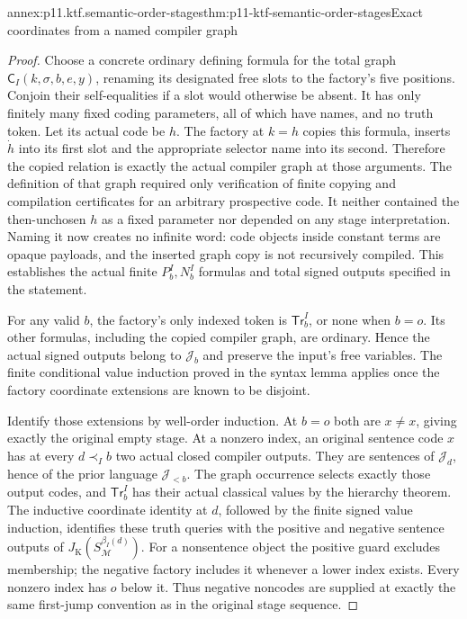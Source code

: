 \begin{annexitem}{annex:p11.ktf.semantic-order-stages}{thm:p11-ktf-semantic-order-stages}{Exact coordinates from a named compiler graph}
\begin{proof}
Choose a concrete ordinary defining formula for the total graph
\(\mathsf C_I(k,\sigma,b,e,y)\), renaming its designated
free slots to the factory's five positions. Conjoin their self-equalities
if a slot would otherwise be absent. It has only finitely many
fixed coding parameters, all of which have names, and no truth token.
Let its actual code be \(h\). The factory at \(k=h\) copies
this formula, inserts \(\dot h\) into its first slot and the
appropriate selector name into its second. Therefore the copied
relation is exactly the actual compiler graph at those arguments.
The definition of that graph required only verification of finite
copying and compilation certificates for an arbitrary prospective
code. It neither contained the then-unchosen \(h\) as a fixed
parameter nor depended on any stage interpretation. Naming it now
creates no infinite word: code objects inside constant terms are
opaque payloads, and the inserted graph copy is not recursively
compiled. This establishes the actual finite \(P^I_b,N^I_b\)
formulas and total signed outputs specified in the statement.

For any valid \(b\), the factory's only indexed token is
\(\mathsf{Tr}^{I}_b\), or none when \(b=o\). Its other
formulas, including the copied compiler graph, are ordinary. Hence
the actual signed outputs belong to \(\mathcal J_b\) and
preserve the input's free variables. The finite conditional value
induction proved in the syntax lemma applies once the factory
coordinate extensions are known to be disjoint.

Identify those extensions by well-order induction. At \(b=o\)
both are \(x\ne x\), giving exactly the original empty stage.
At a nonzero index, an original sentence code \(x\) has at
every \(d\prec_I b\) two actual closed compiler outputs.
They are sentences of \(\mathcal J_d\), hence of the prior
language \(\mathcal J_{<b}\). The graph occurrence selects
exactly those output codes, and \(\mathsf{Tr}^{I}_b\) has
their actual classical values by the hierarchy theorem. The
inductive coordinate identity at \(d\), followed by the finite
signed value induction, identifies these truth queries with the
positive and negative sentence outputs of
\(J_{\mathrm K}(S_{\mathcal M}^{\beta_I(d)})\).
For a nonsentence object the positive guard excludes membership;
the negative factory includes it whenever a lower index exists.
Every nonzero index has \(o\) below it. Thus negative noncodes
are supplied at exactly the same first-jump convention as in the
original stage sequence.


\end{proof}
\end{annexitem}
